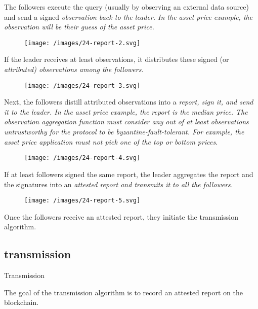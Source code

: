 \documentclass{article}
\begin{document}
The followers execute the query (usually by observing an external data source) and send a signed \em{observation} back to the leader.
In the asset price example, the observation will be their guess of the asset price.
\begin{figure}[grayscale-diagram,medium-size]
\texttt{[image: /images/24-report-2.svg]}
\end{figure}

If the leader receives at least  observations, it distributes these signed (or \em{attributed}) observations among the followers.
\begin{figure}[grayscale-diagram,medium-size]
\texttt{[image: /images/24-report-3.svg]}
\end{figure}

Next, the followers distill attributed observations into a \em{report}, sign it, and send it to the leader.
In the asset price example, the report is the median price.
The observation aggregation function must consider any  out of at least  observations untrustworthy for the protocol to be byzantine-fault-tolerant.
For example, the asset price application must not pick one of the top or bottom  prices.
\begin{figure}[grayscale-diagram,medium-size]
\texttt{[image: /images/24-report-4.svg]}
\end{figure}

If at least  followers signed the same report, the leader aggregates the report and the signatures into an \em{attested} report and transmits it to all the followers.
\begin{figure}[grayscale-diagram,medium-size]
\texttt{[image: /images/24-report-5.svg]}
\end{figure}

Once the followers receive an attested report, they initiate the transmission algorithm.

\subsection{transmission}{Transmission}

The goal of the transmission algorithm is to record an attested report on the blockchain.
\end{document}
